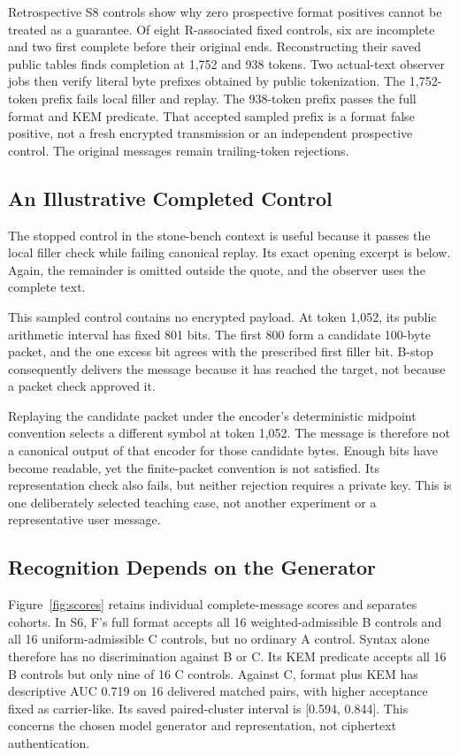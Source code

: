 \documentclass[a4paper,twoside]{article}
\begin{document}
Retrospective S8 controls show why zero prospective format positives cannot be treated as a guarantee. Of eight R-associated fixed controls, six are incomplete and two first complete before their original ends. Reconstructing their saved public tables finds completion at 1,752 and 938 tokens. Two actual-text observer jobs then verify literal byte prefixes obtained by public tokenization. The 1,752-token prefix fails local filler and replay. The 938-token prefix passes the full format and KEM predicate. That accepted sampled prefix is a format false positive, not a fresh encrypted transmission or an independent prospective control. The original messages remain trailing-token rejections.

\subsection{An Illustrative Completed Control}
\noindent The stopped control in the stone-bench context is useful because it passes the local filler check while failing canonical replay. Its exact opening excerpt is below. Again, the remainder is omitted outside the quote, and the observer uses the complete text.
\begin{quote}
\end{quote}
This sampled control contains no encrypted payload. At token 1,052, its public arithmetic interval has fixed 801 bits. The first 800 form a candidate 100-byte packet, and the one excess bit agrees with the prescribed first filler bit. B-stop consequently delivers the message because it has reached the target, not because a packet check approved it.

Replaying the candidate packet under the encoder's deterministic midpoint convention selects a different symbol at token 1,052. The message is therefore not a canonical output of that encoder for those candidate bytes. Enough bits have become readable, yet the finite-packet convention is not satisfied. Its representation check also fails, but neither rejection requires a private key. This is one deliberately selected teaching case, not another experiment or a representative user message.

\subsection{Recognition Depends on the Generator}
\noindent Figure~\ref{fig:scores} retains individual complete-message scores and separates cohorts. In S6, F's full format accepts all 16 weighted-admissible B controls and all 16 uniform-admissible C controls, but no ordinary A control. Syntax alone therefore has no discrimination against B or C. Its KEM predicate accepts all 16 B controls but only nine of 16 C controls. Against C, format plus KEM has descriptive AUC 0.719 on 16 delivered matched pairs, with higher acceptance fixed as carrier-like. Its saved paired-cluster interval is [0.594, 0.844]. This concerns the chosen model generator and representation, not ciphertext authentication.
\end{document}
